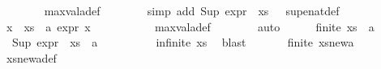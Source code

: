 \begin{isabellebody}
\ \ \ \ \ \ \isamarkupfalse%
\ max{\isacharunderscore}{\kern0pt}val{\isacharunderscore}{\kern0pt}a{\isacharunderscore}{\kern0pt}def\isanewline
\ \ \ \ \ \ \isamarkupfalse%
\ {\isacharparenleft}{\kern0pt}simp\ add{\isacharcolon}{\kern0pt}\ {\isacartoucheopen}Sup\ {\isacharparenleft}{\kern0pt}expr{\isacharunderscore}{\kern0pt}{}\ {\isacharbackquote}{\kern0pt}\ xs{\isacharparenright}{\kern0pt}\ {\isacharequal}{\kern0pt}\ {\isasyminfinity}{\isacartoucheclose}\ sup{\isacharunderscore}{\kern0pt}enat{\isacharunderscore}{\kern0pt}def{\isacharparenright}{\kern0pt}\isanewline
\ \ \ \ \isamarkupfalse%
\ {}\ \isamarkupfalse%
\ {\isachardoublequoteopen}{\isasymforall}x\ {\isasymin}\ {\isacharparenleft}{\kern0pt}xs\ {\isasymunion}\ {\isacharbraceleft}{\kern0pt}a{\isacharbraceright}{\kern0pt}{\isacharparenright}{\kern0pt}{\isachardot}{\kern0pt}\ expr{\isacharunderscore}{\kern0pt}{}\ x\ {\isacharless}{\kern0pt}\ {\isasyminfinity}{\isachardoublequoteclose}\ \isanewline
\ \ \ \ \ \ \isamarkupfalse%
\ max{\isacharunderscore}{\kern0pt}val{\isacharunderscore}{\kern0pt}a{\isacharunderscore}{\kern0pt}def\isanewline
\ \ \ \ \ \ \isamarkupfalse%
\ auto\isanewline
\ \ \ \ \isamarkupfalse%
\ {\isachardoublequoteopen}{\isasymnot}{\isacharparenleft}{\kern0pt}finite\ {\isacharparenleft}{\kern0pt}xs\ {\isasymunion}\ {\isacharbraceleft}{\kern0pt}a{\isacharbraceright}{\kern0pt}{\isacharparenright}{\kern0pt}{\isacharparenright}{\kern0pt}{\isachardoublequoteclose}\ \isamarkupfalse%
\ {}\ {\isacartoucheopen}Sup\ {\isacharparenleft}{\kern0pt}expr{\isacharunderscore}{\kern0pt}{}\ {\isacharbackquote}{\kern0pt}\ {\isacharparenleft}{\kern0pt}xs\ {\isasymunion}\ {\isacharbraceleft}{\kern0pt}a{\isacharbraceright}{\kern0pt}{\isacharparenright}{\kern0pt}{\isacharparenright}{\kern0pt}\ {\isacharequal}{\kern0pt}\ {\isasyminfinity}{\isacartoucheclose}\isanewline
\ \ \ \ \ \ \isamarkupfalse%
\ {\isacartoucheopen}infinite\ xs{\isacartoucheclose}\ \isamarkupfalse%
\ blast\ \isanewline
\ \ \ \ \isamarkupfalse%
\ {\isachardoublequoteopen}{\isasymnot}{\isacharparenleft}{\kern0pt}finite\ xs{\isacharunderscore}{\kern0pt}new{\isacharunderscore}{\kern0pt}a{\isacharparenright}{\kern0pt}{\isachardoublequoteclose}\ \isanewline
\ \ \ \ \ \ \isamarkupfalse%
\ xs{\isacharunderscore}{\kern0pt}new{\isacharunderscore}{\kern0pt}a{\isacharunderscore}{\kern0pt}def\isanewline

\end{isabellebody}
